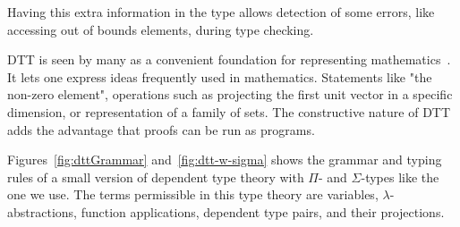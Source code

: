 Having this extra information in the type allows detection of some errors, like accessing out of bounds elements, during type checking. 

DTT is seen by many as a convenient foundation for representing mathematics~\cite{whyDttCoq, whyDTTbauer, nCatShulman}. It lets one express ideas frequently used in mathematics. Statements like "the non-zero element", operations such as projecting the first unit vector in a specific dimension, or representation of a family of sets. 
The constructive nature of DTT adds the advantage that proofs can be run as programs. 

Figures~\ref{fig:dttGrammar} and~\ref{fig:dtt-w-sigma} shows the grammar and typing rules of a small version of dependent type theory with $\Pi$- and $\Sigma$-types like the one we use. The terms permissible in this type theory are variables, $\lambda$-abstractions, function applications, dependent type pairs, and their projections. 

